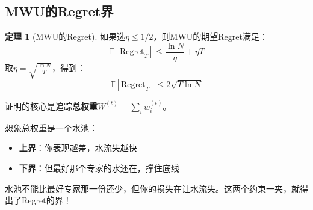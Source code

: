 \documentclass[11pt,a4paper]{article}
\theoremstyle{definition}
\newtheorem{theorem}{定理}[section]
\begin{document}
\subsection{MWU的Regret界}

\begin{theorem}[MWU的Regret]
如果选$\eta \leq 1/2$，则MWU的期望Regret满足：
\[
\mathbb{E}[\text{Regret}_T] \leq \frac{\ln N}{\eta} + \eta T
\]
取$\eta = \sqrt{\frac{\ln N}{T}}$，得到：
\[
\mathbb{E}[\text{Regret}_T] \leq 2\sqrt{T \ln N}
\]
\end{theorem}

\begin{plainwords}[证明的直觉]
证明的核心是追踪\textbf{总权重}$W^{(t)} = \sum_i w_i^{(t)}$。

想象总权重是一个水池：
\begin{itemize}
    \item \textbf{上界}：你表现越差，水流失越快
    \item \textbf{下界}：但最好那个专家的水还在，撑住底线
\end{itemize}

水池不能比最好专家那一份还少，但你的损失在让水流失。这两个约束一夹，就得出了Regret的界！
\end{plainwords}
\end{document}
